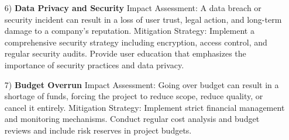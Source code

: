 \begin{itemize}
    \item [6)]
    \textbf{Data Privacy and Security} 
    Impact Assessment: A data breach or security incident can result in a loss of user trust, legal action, and long-term damage to a company's reputation.
    Mitigation Strategy: Implement a comprehensive security strategy including encryption, access control, and regular security audits. Provide user education that emphasizes the importance of security practices and data privacy.
    \item [7)]
    \textbf{Budget Overrun} 
    Impact Assessment: Going over budget can result in a shortage of funds, forcing the project to reduce scope, reduce quality, or cancel it entirely.
    Mitigation Strategy: Implement strict financial management and monitoring mechanisms. Conduct regular cost analysis and budget reviews and include risk reserves in project budgets.
\end{itemize}